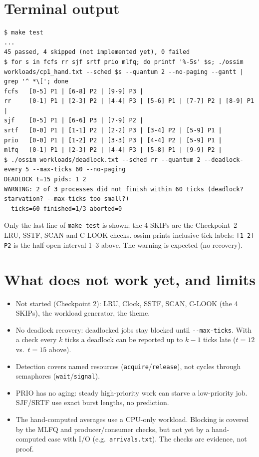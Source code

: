 \documentclass[10pt,a4paper]{article}
\newcommand{\code}[1]{\texttt{#1}}
\begin{document}
\section{Terminal output}
\begin{lstlisting}
$ make test
...
45 passed, 4 skipped (not implemented yet), 0 failed
$ for s in fcfs rr sjf srtf prio mlfq; do printf '%-5s' $s; ./ossim workloads/cp1_hand.txt --sched $s --quantum 2 --no-paging --gantt | grep '^ *\['; done
fcfs   [0-5] P1 | [6-8] P2 | [9-9] P3 |
rr     [0-1] P1 | [2-3] P2 | [4-4] P3 | [5-6] P1 | [7-7] P2 | [8-9] P1 |
sjf    [0-5] P1 | [6-6] P3 | [7-9] P2 |
srtf   [0-0] P1 | [1-1] P2 | [2-2] P3 | [3-4] P2 | [5-9] P1 |
prio   [0-0] P1 | [1-2] P2 | [3-3] P3 | [4-4] P2 | [5-9] P1 |
mlfq   [0-1] P1 | [2-3] P2 | [4-4] P3 | [5-8] P1 | [9-9] P2 |
$ ./ossim workloads/deadlock.txt --sched rr --quantum 2 --deadlock-every 5 --max-ticks 60 --no-paging
DEADLOCK t=15 pids: 1 2
WARNING: 2 of 3 processes did not finish within 60 ticks (deadlock? starvation? --max-ticks too small?)
  ticks=60 finished=1/3 aborted=0
\end{lstlisting}
Only the last line of \code{make test} is shown; the 4 SKIPs are the Checkpoint~2 LRU, SSTF, SCAN and C-LOOK checks.
ossim prints inclusive tick labels: \code{[1-2] P2} is the half-open interval 1--3 above. The warning is expected (no recovery).

\section{What does not work yet, and limits}
\begin{itemize}
\item Not started (Checkpoint 2): LRU, Clock, SSTF, SCAN, C-LOOK (the 4 SKIPs), the workload generator, the theme.
\item No deadlock recovery: deadlocked jobs stay blocked until \code{-{}-max-ticks}. With a check every $k$ ticks a deadlock can be reported up to $k-1$ ticks late ($t=12$ vs.\ $t=15$ above).
\item Detection covers named resources (\code{acquire}/\code{release}), not cycles through semaphores (\code{wait}/\code{signal}).
\item PRIO has no aging: steady high-priority work can starve a low-priority job. SJF/SRTF use exact burst lengths, no prediction.
\item The hand-computed averages use a CPU-only workload. Blocking is covered by the MLFQ and producer/consumer checks, but not yet by a hand-computed case with I/O (e.g.\ \code{arrivals.txt}). The checks are evidence, not proof.
\end{itemize}
\end{document}
